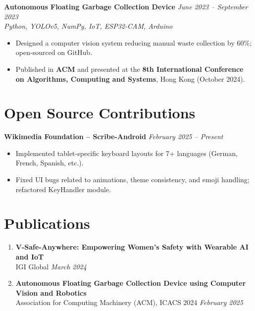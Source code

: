 \documentclass[10pt, letterpaper]{article}
\begin{document}
\vspace{4pt}
\textbf{Autonomous Floating Garbage Collection Device} \hfill \textit{June 2023 -- September 2023} \\
\textit{Python, YOLOv5, NumPy, IoT, ESP32-CAM, Arduino}
\begin{itemize}[leftmargin=*, noitemsep, topsep=2pt]
    \item Designed a computer vision system reducing manual waste collection by 60\%; open-sourced on GitHub.
    \item Published in \textbf{ACM} and presented at the \textbf{8th International Conference on Algorithms, Computing and Systems}, Hong Kong (October 2024).
\end{itemize}

\section{Open Source Contributions}

\textbf{Wikimedia Foundation -- Scribe-Android} \hfill \textit{February 2025 -- Present}
\begin{itemize}[leftmargin=*, noitemsep, topsep=2pt]
    \item Implemented tablet-specific keyboard layouts for 7+ languages (German, French, Spanish, etc.).
    \item Fixed UI bugs related to animations, theme consistency, and emoji handling; refactored KeyHandler module.
\end{itemize}

\section{Publications}

\begin{enumerate}[leftmargin=*, noitemsep, topsep=2pt]
    \item \textbf{V-Safe-Anywhere: Empowering Women's Safety with Wearable AI and IoT} \\
    IGI Global \hfill \textit{March 2024}
    \item \textbf{Autonomous Floating Garbage Collection Device using Computer Vision and Robotics} \\
    Association for Computing Machinery (ACM), ICACS 2024 \hfill \textit{February 2025}
\end{enumerate}
\end{document}
